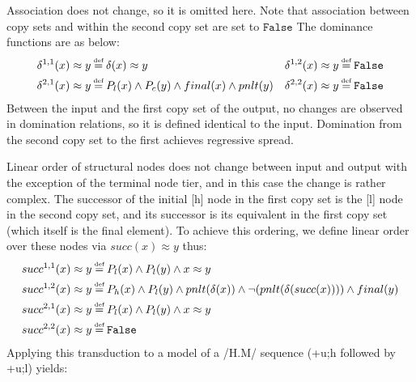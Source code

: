 \documentclass{article}
\newcommand\myeq{\mathrel{\stackrel{\makebox[0pt]{\mbox{\normalfont\tiny def}}}{=}}}
\newcommand{\ap}{\approx}
\begin{document}
Association does not change, so it is omitted here. Note that association between copy sets and within the second copy set are set to $\mathtt{False}$ The dominance functions are as below:
\begin{equation}
\begin{aligned}
\delta^{1,1}(x)\ap y&\myeq \delta(x)\ap y & \delta^{1,2}(x)\ap y&\myeq \mathtt{False} \\
\delta^{2,1}(x)\ap y&\myeq P_{l}(x)\land P_{c}(y)\land final(x)\land pnlt(y) & \delta^{2,2}(x)\ap y&\myeq \mathtt{False} \\
\end{aligned}
\end{equation}
Between the input and the first copy set of the output, no changes are observed in domination relations, so it is defined identical to the input. Domination from the second copy set to the first achieves regressive spread. \par
Linear order of structural nodes does not change between input and output with the exception of the terminal node tier, and in this case the change is rather complex. The successor of the initial [h] node in the first copy set is the [l] node in the second copy set, and its successor is its equivalent in the first copy set (which itself is the final element). To achieve this ordering, we define linear order over these nodes via $succ(x)\ap y$ thus:
\begin{equation}
\begin{aligned}
succ^{1,1}(x)\ap y&\myeq P_{l}(x)\land P_{l}(y)\land x \ap y \\
succ^{1,2}(x)\ap y&\myeq P_{h}(x)\land P_{l}(y) \land pnlt(\delta(x)) \land \neg(pnlt(\delta(succ(x))))\land final(y) \\
succ^{2,1}(x)\ap y&\myeq P_{l}(x) \land P_{l}(y)\land x \ap y \\
succ^{2,2}(x)\ap y&\myeq \mathtt{False} \\
\end{aligned}
\end{equation}
Applying this transduction to a model of a /H.M/ sequence (+u;h followed by +u;l) yields:
\end{document}
